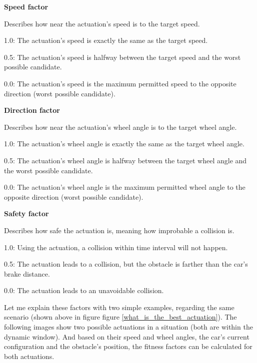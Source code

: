 \begin{minipage}{\textwidth}
\textbf{Speed factor}

Describes how near the actuation's speed is to the target speed.

1.0: The actuation's speed is exactly the same as the target speed.

0.5: The actuation's speed is halfway between the target speed and the worst possible candidate.

0.0: The actuation's speed is the maximum permitted speed to the opposite direction (worst possible candidate).
\end{minipage}

\begin{minipage}{\textwidth}
\textbf{Direction factor}

Describes how near the actuation's wheel angle is to the target wheel angle.

1.0: The actuation's wheel angle is exactly the same as the target wheel angle.

0.5: The actuation's wheel angle is halfway between the target wheel angle and the worst possible candidate.

0.0: The actuation's wheel angle is the maximum permitted wheel angle to the opposite direction (worst possible candidate).
\end{minipage}

\begin{minipage}{\textwidth}
\textbf{Safety factor}

Describes how safe the actuation is, meaning how improbable a collision is.

1.0: Using the actuation, a collision within time interval will not happen.

0.5: The actuation leads to a collision, but the obstacle is farther than the car's brake distance.

0.0: The actuation leads to an unavoidable collision.
\end{minipage}

Let me explain these factors with two simple examples, regarding the same scenario (shown above in figure figure \ref{what_is_the_best_actuation}).
The following images show two possible actuations in a situation (both are within the dynamic window). And based on their speed and wheel angles, the car's current configuration and the obstacle's position, the fitness factors can be calculated for both actuations.

